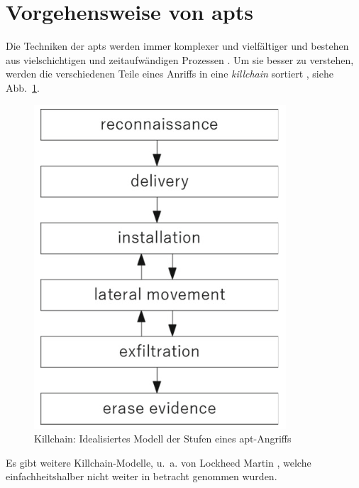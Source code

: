 \documentclass[conference]{IEEEtran}
\begin{document}
\section{Vorgehensweise von \aclp{apt}}
Die Techniken der \acp{apt} werden immer komplexer und vielfältiger und bestehen aus vielschichtigen und zeitaufwändigen Prozessen \cite[S.~7f]{Steffens2020}.
Um sie besser zu verstehen, werden die verschiedenen Teile eines Anriffs in eine \textit{killchain} sortiert \cite[S.~8]{Steffens2020}, siehe Abb.~\ref{fig.killchain}.
\begin{figure}[htbp]
    \centerline{\includegraphics[scale=0.8]{figures/killchain.png}}
    \caption{Killchain: Idealisiertes Modell der Stufen eines \ac{apt}-Angriffs \cite[S.~8]{Steffens2020}}
    \label{fig.killchain}
\end{figure}
Es gibt weitere Killchain-Modelle, u.~a. von Lockheed Martin \cite{LockheedMartin}, welche einfachheitshalber nicht weiter in betracht genommen wurden.
\end{document}
